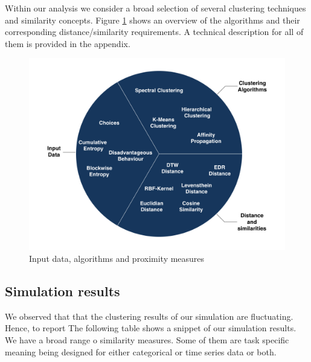 \documentclass[12pt,a4paper,bibliography=totocnumbered,listof=totocnumbered]{scrartcl}
\begin{document}
Within our analysis we consider a broad selection of several clustering techniques and similarity concepts. Figure \ref{fig:cla} shows an overview of the algorithms and their corresponding distance/similarity requirements. A technical description for all of them is provided in the appendix. 
\begin{figure}[H]
	\includegraphics[width=\textwidth]{Pictures/DataClustering.jpeg}
	\caption{Input data, algorithms and proximity measures}
	\label{fig:cla}
\end{figure}

\subsection{Simulation results}

We observed that that the clustering results of our simulation are fluctuating. Hence, to report 
The following table shows a snippet of our simulation results. We have a broad range o similarity measures. Some of them are task specific meaning being designed for either categorical or time series data or both.
\end{document}
